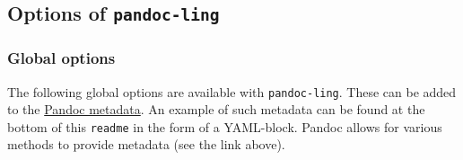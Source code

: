 \documentclass[
]{article}
\begin{document}
\hypertarget{options-of-pandoc-ling}{%
\subsection{\texorpdfstring{Options of
\texttt{pandoc-ling}}{Options of pandoc-ling}}\label{options-of-pandoc-ling}}

\hypertarget{global-options}{%
\subsubsection{Global options}\label{global-options}}

The following global options are available with \texttt{pandoc-ling}.
These can be added to the
\href{https://pandoc.org/MANUAL.html\#metadata-blocks}{Pandoc metadata}.
An example of such metadata can be found at the bottom of this
\texttt{readme} in the form of a YAML-block. Pandoc allows for various
methods to provide metadata (see the link above).
\end{document}
